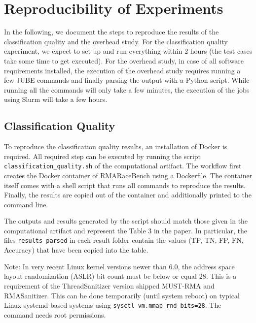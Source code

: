 \documentclass[twoside]{article}
\begin{document}
\section*{Reproducibility of Experiments}
In the following, we document the steps to reproduce the results of the classification quality and the overhead study.
For the classification quality experiment, we expect to set up and run everything within 2 hours (the test cases take some time to get executed).
For the overhead study, in case of all software requirements installed, the execution of the overhead study requires running a few JUBE commands and finally parsing the output with a Python script. While running all the commands will only take a few minutes, the execution of the jobs using Slurm will take a few hours.

\subsection*{Classification Quality}
To reproduce the classification quality results, an installation of Docker is required.
All required step can be executed by running the script \texttt{classification\_quality.sh} of the computational artifact.
The workflow first creates the Docker container of RMARaceBench using a Dockerfile.
The container itself comes with a shell script that runs all commands to reproduce the results.
Finally, the results are copied out of the container and additionally printed to the command line.

The outputs and results generated by the script should match those given in the computational artifact and represent the Table 3 in the paper.
In particular, the files \texttt{results\_parsed} in each result folder contain the values (TP, TN, FP, FN, Accuracy) that have been copied into the table.

Note: In very recent Linux kernel versions newer than 6.0, the address space layout randomization (ASLR) bit count must be below or equal 28. This is a requirement of the ThreadSanitizer version shipped MUST-RMA and RMASanitizer. This can be done temporarily (until system reboot) on typical Linux systemd-based systems using \texttt{sysctl vm.mmap\_rnd\_bits=28}. The command needs root permissions. 
\end{document}
